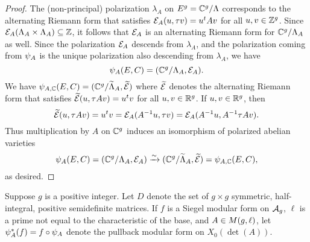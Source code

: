 \documentclass{amsart}
\begin{document}
\begin{proof}
The (non-principal) polarization $\lambda_A$ on $E^g = \mathbb{C}^g/\Lambda$ corresponds to the alternating Riemann form that satisfies $\mathcal{E}_A(u,\tau v) = u^tAv$ for all $u,v \in \mathbb{Z}^g$. Since $\mathcal{E}_A(\Lambda_A \times \Lambda_A) \subseteq \mathbb{Z}$, it follows that $\mathcal{E}_A$ is an alternating Riemann form for $\mathbb{C}^g/\Lambda_A$ as well. 
Since the polarization $\mathcal{E}_A$ descends from $\lambda_A$, and the polarization coming from $\psi_{A}$ is the unique polarization also descending from $\lambda_A$, we have
\[
  \psi_{A}(E,C) = (\mathbb{C}^g/\Lambda_A, \mathcal{E}_A).
\]
We have ${\psi}_{A, \mathbb{C}}(E,C) = (\mathbb{C}^g/\widetilde{\Lambda}_A, \widetilde{\mathcal{E}})$ where
 $\widetilde{\mathcal{E}}$ denotes the %
alternating Riemann form %
that satisfies %
$\widetilde{\mathcal{E}}(u, \tau A v) = u^tv$ for all $u,v \in \mathbb{R}^g$. If $u, v \in \mathbb{R}^g$, then
$$  \widetilde{\mathcal{E}}(u, \tau A v) = u^tv 
                          = \mathcal{E}_A(A^{-1}u, \tau v) 
                          = \mathcal{E}_{A}(A^{-1}u, A^{-1}\tau Av).$$
Thus multiplication by $A$ on $\mathbb{C}^g$ induces an isomorphism of polarized abelian varieties
\[
  \psi_{A}(E,C) = (\mathbb{C}^g/\Lambda_A, \mathcal{E}_A) \xrightarrow{\sim} (\mathbb{C}^g/\widetilde{\Lambda}_A, \widetilde{\mathcal{E}}) = {\psi}_{A, \mathbb{C}}(E,C),
\]
as desired.
\end{proof}

Suppose $g$ is a positive integer.
   Let $D$ denote the set of $g \times g$ symmetric, half-integral, positive semidefinite matrices. 
   If $f$ is a Siegel modular form on $\mathcal{A}_g$, $\ell$ is a prime not equal to the characteristic of the base, and $A\in M(g,\ell)$, let $\psi_{A}^*(f) = f \circ \psi_{A}$ denote the pullback modular form on $X_0(\det(A))$.
\end{document}
